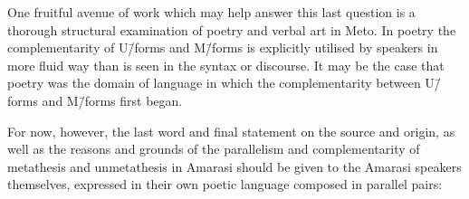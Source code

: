 One fruitful avenue of work which may help answer this last
question is a thorough structural examination of poetry and
verbal art in Meto. In poetry the complementarity of U\=/forms
and M\=/forms is explicitly utilised by speakers in more fluid
way than is seen in the syntax or discourse.
It may be the case that poetry was the domain of
language in which the complementarity between U\=/forms and M\=/forms first began.

For now, however, the last word and final statement on the
source and origin, as well as the reasons and grounds
of the parallelism and complementarity of metathesis and unmetathesis
in Amarasi should be given to the Amarasi speakers themselves,
expressed in their own poetic language composed in parallel pairs:

\begin{exe}
	\vspace{4pt}\label{ex:24/05/2009}
	\begin{xlist}
		\vspace{4pt}
		\vspace{4pt}
		\vspace{4pt}
	\end{xlist}
\end{exe}
